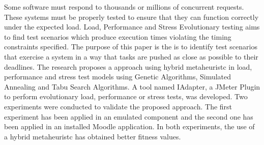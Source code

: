 Some software must respond to  thousands or millions of concurrent requests. 
These systems must be properly tested to ensure that they can function correctly under the expected load.  
Load, Performance and Stress Evolutionary testing aims to find test scenarios which produce execution times violating the timing constraints specified. 
The purpose of this paper is the is to identify  test scenarios that exercise a system in a way that tasks are pushed as close as possible to their deadlines. The research proposes  a approach using hybrid metaheuristc in load, performance and stress test models using Genetic Algorithms, Simulated Annealing and Tabu Search Algorithms. A tool named IAdapter, a JMeter Plugin to perform evolutionary load, performance or stress tests, was developed. Two experiments were conducted to validate the proposed approach. The first experiment has been applied in an emulated component and the second one has been applied in an installed Moodle application. In both experiments, the use of a hybrid metaheuristc has obtained better fitness values.
%
% 
%

%
%
